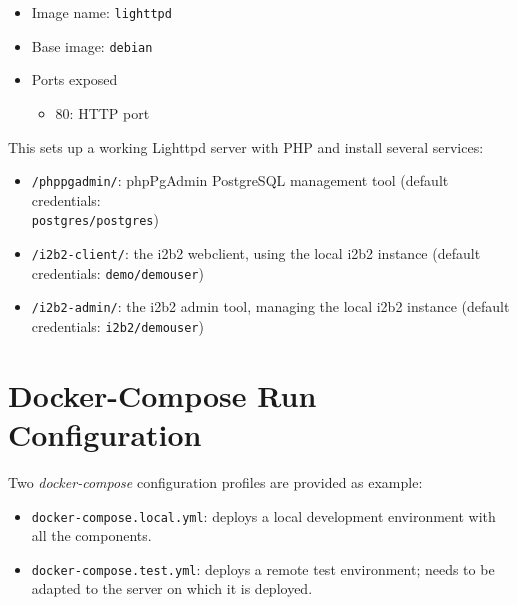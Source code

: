 \begin{itemize}
    \item Image name: \verb|lighttpd|
    \item Base image: \verb|debian|
    \item Ports exposed
        \begin{itemize}
        \item 80: HTTP port
        \end{itemize}
\end{itemize}

This sets up a working Lighttpd server with PHP and install several services:
\begin{itemize}
    \item \verb|/phppgadmin/|: phpPgAdmin PostgreSQL management tool (default credentials: \\
    \verb|postgres/postgres|)
    \item \verb|/i2b2-client/|: the i2b2 webclient, using the local i2b2 instance (default credentials: \verb|demo/demouser|)
    \item \verb|/i2b2-admin/|: the i2b2 admin tool, managing the local i2b2 instance (default credentials: \verb|i2b2/demouser|)
\end{itemize}

\section{Docker-Compose Run Configuration}
Two \emph{docker-compose} configuration profiles are provided as example:
\begin{itemize}
    \item \verb|docker-compose.local.yml|: deploys a local development environment with all the components.
    \item \verb|docker-compose.test.yml|: deploys a remote test environment; needs to be adapted to the server on which it is deployed.
\end{itemize}
